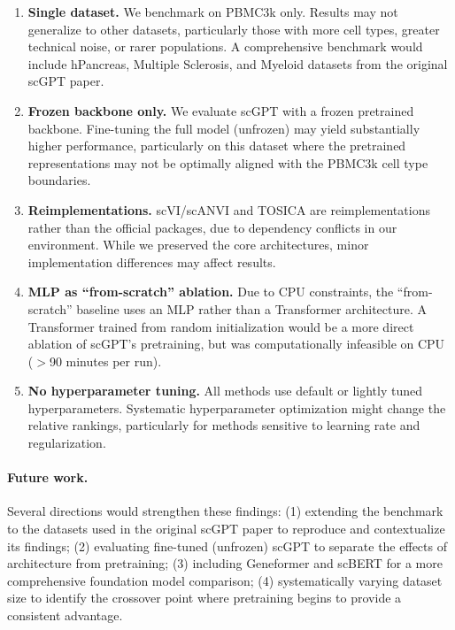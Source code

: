\documentclass{article}
\begin{document}
\begin{enumerate}[leftmargin=*, itemsep=2pt]
  \item \textbf{Single dataset.} We benchmark on PBMC3k only. Results may not generalize
    to other datasets, particularly those with more cell types, greater technical noise,
    or rarer populations. A comprehensive benchmark would include hPancreas, Multiple
    Sclerosis, and Myeloid datasets from the original scGPT paper.
  \item \textbf{Frozen backbone only.} We evaluate scGPT with a frozen pretrained backbone.
    Fine-tuning the full model (unfrozen) may yield substantially higher performance,
    particularly on this dataset where the pretrained representations may not be optimally
    aligned with the PBMC3k cell type boundaries.
  \item \textbf{Reimplementations.} scVI/scANVI and TOSICA are reimplementations rather
    than the official packages, due to dependency conflicts in our environment. While we
    preserved the core architectures, minor implementation differences may affect results.
  \item \textbf{MLP as ``from-scratch'' ablation.} Due to CPU constraints, the
    ``from-scratch'' baseline uses an MLP rather than a Transformer architecture. A
    Transformer trained from random initialization would be a more direct ablation of
    scGPT's pretraining, but was computationally infeasible on CPU ($>$90 minutes per run).
  \item \textbf{No hyperparameter tuning.} All methods use default or lightly tuned
    hyperparameters. Systematic hyperparameter optimization might change the relative
    rankings, particularly for methods sensitive to learning rate and regularization.
\end{enumerate}

\paragraph{Future work.}
Several directions would strengthen these findings: (1) extending the benchmark to the
datasets used in the original scGPT paper to reproduce and contextualize its findings;
(2) evaluating fine-tuned (unfrozen) scGPT to separate the effects of architecture from
pretraining; (3) including Geneformer and scBERT for a more comprehensive foundation
model comparison; (4) systematically varying dataset size to identify the crossover point
where pretraining begins to provide a consistent advantage.
\end{document}

